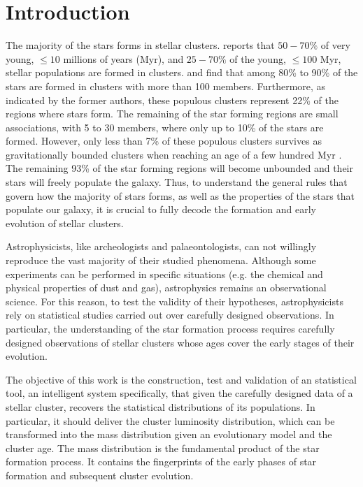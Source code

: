 \chapter{Introduction}
\label{chap:introduction}

The majority of the stars forms in stellar clusters. \citet{2000AJ....120.3139C} reports that $50-70\%$ of very young, $\leq10$ millions of years (Myr), and $25-70\%$ of the young, $\leq100$ Myr, stellar populations are formed in clusters. \citet{2003AJ....126.1916P} and \citet{2003ARA&A..41...57L} find that among 80\% to 90\% of the stars are formed in clusters with more than 100 members. Furthermore, as indicated by the former authors, these populous clusters represent 22\% of the regions where stars form. The remaining of the star forming regions are small associations, with 5 to 30 members, where only up to 10\% of the stars are formed. However, only less than 7\% of these populous clusters survives as gravitationally bounded clusters when reaching an age of a few hundred Myr \citep{2003ARA&A..41...57L}. The remaining 93\% of the star forming regions will become unbounded and their stars will freely populate the galaxy. Thus, to understand the general rules that govern how the majority of stars forms, as well as the properties of the stars that populate our galaxy, it is crucial to fully decode the formation and early evolution of stellar clusters. 

Astrophysicists, like archeologists and palaeontologists, can not willingly reproduce the vast majority of their studied phenomena. Although some experiments can be performed in specific situations (e.g. the chemical and physical  properties of dust and gas), astrophysics remains an observational science. For this reason, to test the validity of their hypotheses, astrophysicists rely on statistical studies carried out over carefully designed observations. In particular, the understanding of the star formation process requires carefully designed observations of  stellar clusters whose ages cover the early stages of their evolution.

The objective of this work is the construction, test and validation of an statistical tool, an intelligent system specifically, that given the carefully designed data of a stellar cluster, recovers the statistical distributions of its populations. In particular, it should deliver the cluster luminosity distribution, which can be transformed into the mass distribution given an evolutionary model and the cluster age. The mass distribution is the fundamental product of the star formation process. It contains the fingerprints of the early phases of star formation and subsequent cluster evolution.

